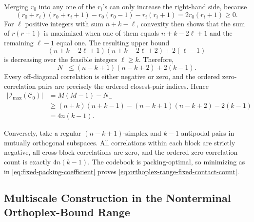 \documentclass[12pt,draftclsnofoot,onecolumn]{IEEEtran}
\newcommand{\cC}{\mathcal{C}}
\newcommand{\cI}{\mathcal{I}}
\theoremstyle{definition}
\begin{document}
\begin{IEEEproof}
Merging \(r_0\) into any one of the \(r_i\)'s can only increase the
right-hand side, because
\begin{equation*}
  (r_0+r_i)(r_0+r_i+1)
  -r_0(r_0-1)-r_i(r_i+1)
  =2r_0(r_i+1)\geq0.
\end{equation*}
For \(\ell\) positive integers with sum \(n+k-\ell\), convexity then
shows that the sum of \(r(r+1)\) is maximized when one of them equals
\(n+k-2\ell+1\) and the remaining \(\ell-1\) equal one.  The resulting
upper bound
\begin{equation*}
  (n+k-2\ell+1)(n+k-2\ell+2)+2(\ell-1)
\end{equation*}
is decreasing over the feasible integers \(\ell\geq k\).  Therefore,
\begin{equation*}
  N_-
  \leq(n-k+1)(n-k+2)+2(k-1).
\end{equation*}
Every off-diagonal correlation is either negative or zero, and the
ordered zero-correlation pairs are precisely the ordered closest-pair
indices.  Hence
\begin{align*}
  |\cI_{\max}(\cC_0)|
  &=M(M-1)-N_-\\
  &\geq(n+k)(n+k-1)
  -(n-k+1)(n-k+2)-2(k-1)\\
  &=4n(k-1).
\end{align*}

Conversely, take a regular \((n-k+1)\)-simplex and \(k-1\) antipodal
pairs in mutually orthogonal subspaces.  All correlations within each
block are strictly negative, all cross-block correlations are zero,
and the ordered zero-correlation count is exactly \(4n(k-1)\).  The
codebook is packing-optimal, so minimizing as in
\eqref{eq:fixed-packing-coefficient} proves
\eqref{eq:orthoplex-range-fixed-contact-count}.
\end{IEEEproof}

\subsection{Multiscale Construction in the Nonterminal Orthoplex-Bound Range}
\end{document}

